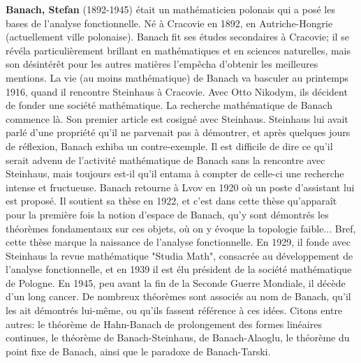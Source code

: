 \textbf{Banach, Stefan} (1892-1945) était un mathématicien polonais qui a posé les bases de l'analyse fonctionnelle. Né à Cracovie en 1892, en Autriche-Hongrie (actuellement ville polonaise). Banach fit ses études secondaires à Cracovie; il se révéla particulièrement brillant en mathématiques et en sciences naturelles, mais son désintérêt pour les autres matières l'empêcha d'obtenir les meilleures mentions.  La vie (au moins mathématique) de Banach va basculer au printemps 1916, quand il rencontre Steinhaus à Cracovie. Avec Otto Nikodym, ils décident de fonder une société mathématique. La recherche mathématique de Banach commence là. Son premier article est cosigné avec Steinhaus. Steinhaus lui avait parlé d'une propriété qu'il ne parvenait pas à démontrer, et après quelques jours de réflexion, Banach exhiba un contre-exemple. Il est difficile de dire ce qu'il serait advenu de l'activité mathématique de Banach sans la rencontre avec Steinhaus, mais toujours est-il qu'il entama à compter de celle-ci une recherche intense et fructueuse. Banach retourne à Lvov en 1920 où un poste d'assistant lui est proposé. Il soutient sa thèse en 1922, et c'est dans cette thèse qu'apparaît pour la première fois la notion d'espace de Banach, qu'y sont démontrés les théorèmes fondamentaux sur ces objets, où on y évoque la topologie faible... Bref, cette thèse marque la naissance de l'analyse fonctionnelle. En 1929, il fonde avec Steinhaus la revue mathématique "Studia Math", consacrée au développement de l'analyse fonctionnelle, et en 1939 il est élu président de la société mathématique de Pologne. En 1945, peu avant la fin de la Seconde Guerre Mondiale, il décède d'un long cancer. De nombreux théorèmes sont associés au nom de Banach, qu'il les ait démontrés lui-même, ou qu'ils fassent référence à ces idées. Citons entre autres: le théorème de Hahn-Banach de prolongement des formes linéaires continues, le théorème de Banach-Steinhaus, de Banach-Alaoglu, le théorème du point fixe de Banach, ainsi que le paradoxe de Banach-Tarski.

